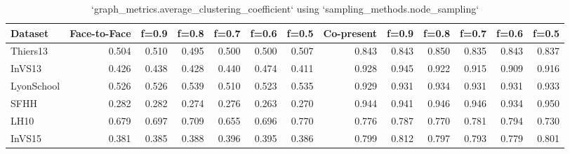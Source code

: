 \begin{table}[ht]
\begin{tabular}{lrrrrrrrrrrrr}
\hline
 Dataset    &   Face-to-Face &   f=0.9 &   f=0.8 &   f=0.7 &   f=0.6 &   f=0.5 &   Co-present &   f=0.9 &   f=0.8 &   f=0.7 &   f=0.6 &   f=0.5 \\
\hline
 Thiers13   &          0.504 &   0.510 &   0.495 &   0.500 &   0.500 &   0.507 &        0.843 &   0.843 &   0.850 &   0.835 &   0.843 &   0.837 \\
 InVS13     &          0.426 &   0.438 &   0.428 &   0.440 &   0.474 &   0.411 &        0.928 &   0.945 &   0.922 &   0.915 &   0.909 &   0.916 \\
 LyonSchool &          0.526 &   0.526 &   0.539 &   0.510 &   0.523 &   0.535 &        0.929 &   0.931 &   0.934 &   0.931 &   0.931 &   0.933 \\
 SFHH       &          0.282 &   0.282 &   0.274 &   0.276 &   0.263 &   0.270 &        0.944 &   0.941 &   0.946 &   0.946 &   0.934 &   0.950 \\
 LH10       &          0.679 &   0.697 &   0.709 &   0.655 &   0.696 &   0.770 &        0.776 &   0.787 &   0.770 &   0.781 &   0.794 &   0.730 \\
 InVS15     &          0.381 &   0.385 &   0.388 &   0.396 &   0.395 &   0.386 &        0.799 &   0.812 &   0.797 &   0.793 &   0.779 &   0.801 \\
\hline
\end{tabular}
\caption{`graph_metrics.average_clustering_coefficient` using `sampling_methods.node_sampling`}
\end{table}